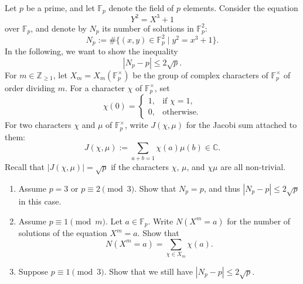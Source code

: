 \begin{exercise}
\label{algebra:2026:2}
Let $p$ be a prime, and let $\mathbb{F}_p$ denote the field of $p$ elements. Consider the equation
\[
Y^2=X^3+1
\]
over $\mathbb{F}_p$, and denote by $N_p$ its number of solutions in $\mathbb{F}_p^2$:
\[
N_p:=\#\{(x,y)\in \mathbb{F}_p^2\mid y^2=x^3+1\}.
\]
In the following, we want to show the inequality
\[
|N_p-p|\leq 2\sqrt{p}.
\]
For $m\in \mathbb{Z}_{\geq 1}$, let $X_m=X_m(\mathbb{F}_p^\times)$ be the group of complex characters of $\mathbb{F}_p^\times$ of order dividing $m$. For a character $\chi$ of $\mathbb{F}_p^\times$, set
\[
\chi(0)=
\begin{cases}
1, & \text{if }\chi=1,\\
0, & \text{otherwise.}
\end{cases}
\]
For two characters $\chi$ and $\mu$ of $\mathbb{F}_p^\times$, write $J(\chi,\mu)$ for the Jacobi sum attached to them:
\[
J(\chi,\mu):=\sum_{a+b=1}\chi(a)\mu(b)\in \mathbb{C}.
\]
Recall that $|J(\chi,\mu)|=\sqrt{p}$ if the characters $\chi$, $\mu$, and $\chi\mu$ are all non-trivial.

\begin{enumerate}
\item[(1)] Assume $p=3$ or $p\equiv 2\pmod 3$. Show that $N_p=p$, and thus $|N_p-p|\leq 2\sqrt{p}$ in this case.
\item[(2)] Assume $p\equiv 1\pmod m$. Let $a\in \mathbb{F}_p$. Write $N(X^m=a)$ for the number of solutions of the equation $X^m=a$. Show that
\[
N(X^m=a)=\sum_{\chi\in X_m}\chi(a).
\]
\item[(3)] Suppose $p\equiv 1\pmod 3$. Show that we still have $|N_p-p|\leq 2\sqrt{p}$.
\end{enumerate}
\end{exercise}

